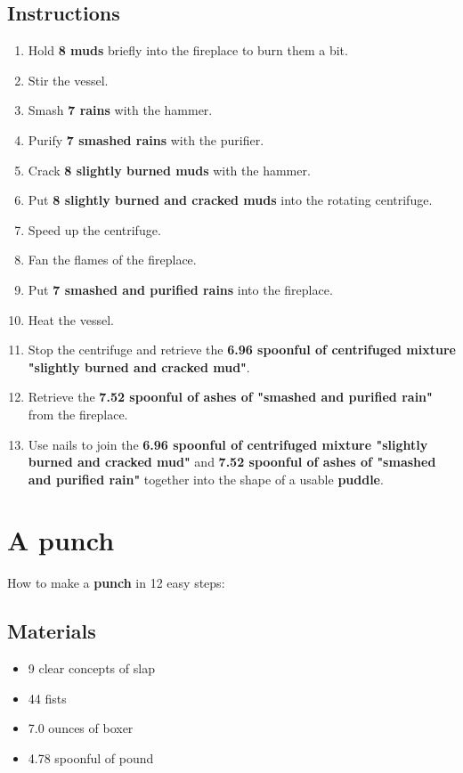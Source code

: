 \documentclass{article}
\begin{document}
\subsection{Instructions}\begin{enumerate}
\item 
Hold \textbf{8 muds} briefly into the fireplace to burn them a bit.
\item 
Stir the vessel.
\item 
Smash \textbf{7 rains} with the hammer.
\item 
Purify \textbf{7 smashed rains} with the purifier.
\item 
Crack \textbf{8 slightly burned muds} with the hammer.
\item 
Put \textbf{8 slightly burned and cracked muds} into the rotating centrifuge.
\item 
Speed up the centrifuge.
\item 
Fan the flames of the fireplace.
\item 
Put \textbf{7 smashed and purified rains} into the fireplace.
\item 
Heat the vessel.
\item 
Stop the centrifuge and retrieve the \textbf{6.96 spoonful of centrifuged mixture "slightly burned and cracked mud"}.
\item 
Retrieve the \textbf{7.52 spoonful of ashes of "smashed and purified rain"} from the fireplace.
\item 
Use nails to join the \textbf{6.96 spoonful of centrifuged mixture "slightly burned and cracked mud"} and \textbf{7.52 spoonful of ashes of "smashed and purified rain"} together into the shape of a usable \textbf{puddle}.
\end{enumerate}
\newpage
\section{A punch}How to make a \textbf{punch} in 12 easy steps:

\subsection{Materials}\begin{itemize}
\item 
9 clear concepts of slap
\item 
44 fists
\item 
7.0 ounces of boxer
\item 
4.78 spoonful of pound
\end{itemize}
\end{document}
